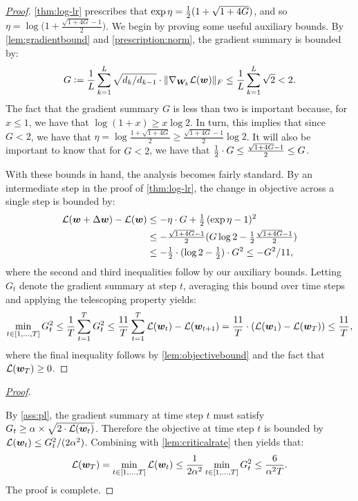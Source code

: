 \criticalrate*
\begin{proof}[\mbox{\hyperref[lem:criticalrate]{Proof}}]\label{proof:criticalrate}
\cref{thm:log-lr} prescribes that $\exp\eta = \tfrac{1}{2}(1+\sqrt{1+4G})$, and so $\eta = \log\big(1+\frac{\sqrt{1+4G}-1}{2}\big)$. We begin by proving some useful auxiliary bounds.  By \cref{lem:gradientbound} and \cref{prescription:norm}, the gradient summary is bounded by:
\begin{align*}
    G \vcentcolon= \frac{1}{L}\sum_{k=1}^L \sqrt{d_k/d_{k-1}} \cdot \Vert { \nabla_{{\bm{W}}_k} \mathcal{L}({\bm{w}})} \Vert_F \leq \frac{1}{L}\sum_{k=1}^L \sqrt{2} < 2.
\end{align*}
The fact that the gradient summary $G$ is less than two is important because, for $x\leq 1$, we have that $\log(1+x) \geq x \log 2$. In turn, this implies that since $G<2$, we have that $\eta = \log \frac{1+\sqrt{1+4G}}{2} \geq \frac{\sqrt{1+4G} - 1}{2} \log 2$. It will also be important to know that for $G<2$, we have that $\tfrac{1}{2}\cdot G \leq \tfrac{\sqrt{1+4G} - 1}{2} \leq G$. 

With these bounds in hand, the analysis becomes fairly standard. By an intermediate step in the proof of \cref{thm:log-lr}, the change in objective across a single step is bounded by:
\begin{align*}
    \mathcal{L}({\bm{w}}+\Delta {\bm{w}})- \mathcal{L}({\bm{w}})&\leq - \eta\cdot G + \tfrac{1}{2} \,(\exp \eta -1)^2 \\
    &\leq - \tfrac{\sqrt{1+4G} - 1}{2} (G \log 2 - \tfrac{1}{2}  \tfrac{\sqrt{1+4G} - 1}{2})\\
    &\leq -\tfrac{1}{2} \cdot (\log 2 - \tfrac{1}{2})\cdot G^2
    \leq -G^2 / 11,
\end{align*}
where the second and third inequalities follow by our auxiliary bounds. Letting $G_t$ denote the gradient summary at step $t$, averaging this bound over time steps and applying the telescoping property yields:
\begin{equation*}
    \min_{t\in[1,...,T]} G_t^2 \leq \frac{1}{T}\sum_{t=1}^{T} G_t^2 \leq \frac{11}{T}\sum_{t=1}^{T} \mathcal{L}({\bm{w}}_t) - \mathcal{L}({\bm{w}}_{t+1}) = \frac{11}{T}\cdot (\mathcal{L}({\bm{w}}_1) - \mathcal{L}({\bm{w}}_T)) \leq \frac{11}{T},
\end{equation*}
where the final inequality follows by \cref{lem:objectivebound} and the fact that $\mathcal{L}({\bm{w}}_T)\geq0$.


\end{proof}

\globalrate*
\begin{proof}[\mbox{\hyperref[thm:globalrate]{Proof}}]\label{proof:globalrate} 

By \cref{ass:pl}, the gradient summary at time step $t$ must satisfy $G_t \geq \alpha \times \sqrt{2\cdot\mathcal{L}({\bm{w}}_t)}$. Therefore the objective at time step $t$ is bounded by $\mathcal{L}({\bm{w}}_t) \leq G_t^2/(2\alpha^2)$. Combining with \cref{lem:criticalrate} then yields that:
\begin{equation*}
\mathcal{L}({\bm{w}}_T) = \min_{t\in[1,...,T]} \mathcal{L}({\bm{w}}_t) \leq \frac{1}{2\alpha^2}\min_{t\in[1,...,T]}G_t^2 \leq \frac{6}{\alpha^2T}.
\end{equation*}
The proof is complete.
\end{proof}

